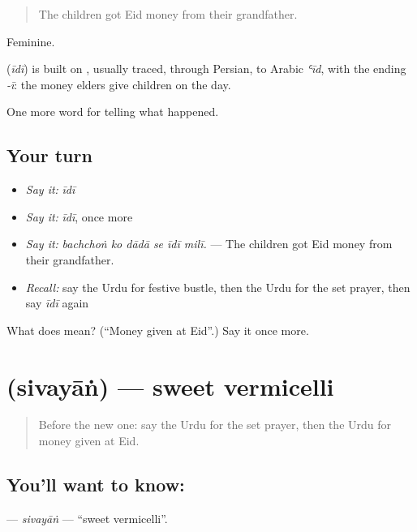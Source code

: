 \begin{quote}
The children got Eid money from their grandfather.
\end{quote}

Feminine.

\begin{cousinweb}
\textbf{} (\emph{īdī}) is built on \textbf{}, usually traced, through Persian, to Arabic \emph{ʿīd}, with the ending \emph{-ī}: the money elders give children on the day.
\end{cousinweb}

\begin{grammarlens}[title={What you've built}]
One more word for telling what happened.
\end{grammarlens}

\subsection*{Your turn}
\begin{itemize}
\raggedright
  \item \emph{Say it:} \emph{īdī}
  \item \emph{Say it:} \emph{īdī}, once more
  \item \emph{Say it:} \emph{bachchoṅ ko dādā se īdī milī.} — The children got Eid money from their grandfather.
  \item \emph{Recall:} say the Urdu for festive bustle, then the Urdu for the set prayer, then say \emph{īdī} again
\end{itemize}

\begin{tcolorbox}[breakable,colback=teal!4,colframe=teal!35!black,title={Before you move on}]
What does  mean? (\textquotedblleft{}Money given at Eid\textquotedblright{}.) Say it once more.
\end{tcolorbox}
\section[\texorpdfstring{\ur{سویاں} (sivayāṅ)}{سویاں (sivayāṅ)}]{ (sivayāṅ) — sweet vermicelli}

\label{lesson:UR-C318-sivayan}



\begin{quote}
Before the new one: say the Urdu for the set prayer, then the Urdu for money given at Eid.
\end{quote}

\subsection*{You'll want to know: }
\textbf{} — \emph{sivayāṅ} — \textquotedblleft{}sweet vermicelli\textquotedblright{}.

